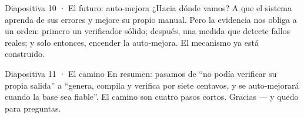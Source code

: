 \documentclass[11pt,a4paper]{article}
\begin{document}
\begin{slide}{Diapositiva 10 · El futuro: auto-mejora}
¿Hacia dónde vamos? A que el sistema aprenda de sus errores y mejore su propio
manual. Pero la evidencia nos obliga a un orden: primero un verificador sólido;
después, una medida que detecte fallos reales; y solo entonces, encender la
auto-mejora. El mecanismo ya está construido.
\end{slide}

\begin{slide}{Diapositiva 11 · El camino}
En resumen: pasamos de ``no podía verificar su propia salida'' a ``genera, compila y
verifica por siete centavos, y se auto-mejorará cuando la base sea fiable''. El camino
son cuatro pasos cortos. Gracias --- y quedo para preguntas.
\end{slide}
\end{document}
